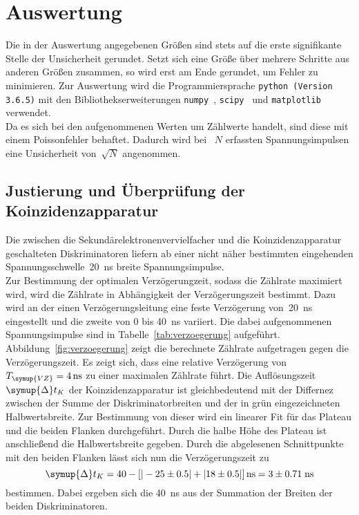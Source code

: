 \section{Auswertung}
\label{sec:auswertung}
Die in der Auswertung angegebenen Größen sind stets auf die erste signifikante
Stelle der Unsicherheit gerundet. Setzt sich eine Größe über mehrere Schritte aus
anderen Größen zusammen, so wird erst am Ende gerundet, um Fehler zu minimieren.
Zur Auswertung wird die Programmiersprache \texttt{python (Version 3.6.5)} mit
den Bibliothekserweiterungen \texttt{numpy}~\cite{numpy},
\texttt{scipy}~\cite{scipy} und \texttt{matplotlib}~\cite{matplotlib} verwendet.\\
\newline
Da es sich bei den aufgenommenen Werten um Zählwerte handelt, sind diese mit einem
Poissonfehler behaftet. Dadurch wird bei ~$N$ erfassten Spannungsimpulsen eine Unsicherheit
von~$\sqrt{N}$ angenommen.

\subsection{Justierung und Überprüfung der Koinzidenzapparatur}
Die zwischen die Sekundärelektronenvervielfacher und die Koinzidenzapparatur
geschalteten Diskriminatoren liefern ab einer nicht näher bestimmten eingehenden
Spannungsschwelle~\SI{20}{\nano\second} breite Spannungsimpulse.\\
\newline
Zur Bestimmung der optimalen Verzögerungzeit, sodass die Zählrate maximiert wird,
wird die Zählrate in Abhängigkeit der Verzögerungszeit bestimmt. Dazu wird an der
einen Verzögerungsleitung eine feste Verzögerung von~\SI{20}{\nano\second} eingestellt
und die zweite von $0$ bis \SI{40}{\nano\second} variiert.
Die dabei aufgenommenen Spannungsimpulse sind in Tabelle~\ref{tab:verzoegerung} aufgeführt.
Abbildung~\ref{fig:verzoegerung} zeigt die berechnete Zählrate aufgetragen gegen
die Verzögerungszeit. Es zeigt sich, dass eine relative Verzögerung
von~$T_{\symup{VZ}}=\SI{4}{\nano\second}$ zu einer maximalen Zählrate führt.
Die Auflösungszeit~$\symup{\Delta}t_K$ der Koinzidenzapparatur ist gleichbedeutend
mit der Differnez zwischen der Summe der Diskriminatorbreiten und der in grün
eingezeichneten Halbwertsbreite. Zur Bestimmung von dieser wird
ein linearer Fit für das Plateau und die beiden Flanken durchgeführt. Durch die halbe
Höhe des Plateau ist anschließend die Halbwertsbreite gegeben. Durch die abgelesenen Schnittpunkte
mit den beiden Flanken lässt sich nun die Verzögerungszeit zu
\begin{equation}
  \symup{\Delta}t_K = 40 - \left[ |-25 \pm 0.5| + |18 \pm 0.5| \right] \si{\nano\second} = \- 3 \pm 0.71\; \si{\nano\second}
\end{equation}
bestimmen. Dabei ergeben sich die \SI{40}{\nano\second} aus der Summation der Breiten der beiden Diskriminatoren.

